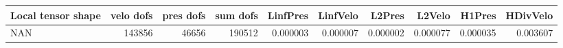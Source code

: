 \begin{tabular}{lrrrrrrrrr}
\toprule
Local tensor shape &  velo dofs &  pres dofs &  sum dofs &  LinfPres &  LinfVelo &   L2Pres &   L2Velo &   H1Pres &  HDivVelo \\
\midrule
               NAN &     143856 &      46656 &    190512 &  0.000003 &  0.000007 & 0.000002 & 0.000077 & 0.000035 &  0.003607 \\
\bottomrule
\end{tabular}
